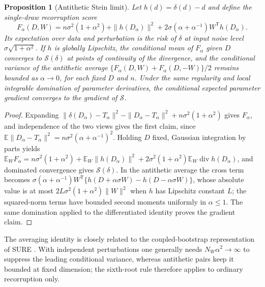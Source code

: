 \documentclass[11pt]{article}
\theoremstyle{plain}\newtheorem{proposition}{Proposition}
\newcommand{\E}{\mathbb E}
\begin{document}
\begin{proposition}[Antithetic Stein limit]\label{prop:antithetic}
Let $h(d)=\delta(d)-d$ and define the single-draw recorruption score
$$
F_\alpha(D,W)=n\sigma^2(1+\alpha^2)+\|h(D_\alpha)\|^2+2\sigma(\alpha+\alpha^{-1})W^{\mathsf T}h(D_\alpha).
$$
Its expectation over data and perturbation is the risk of $\delta$ at input noise level
$\sigma\sqrt{1+\alpha^2}$. If $h$ is globally Lipschitz, the conditional mean of $F_\alpha$ given $D$
converges to $\mathcal S(\delta)$ at points of continuity of the divergence, and the
conditional variance of the antithetic average $\{F_\alpha(D,W)+F_\alpha(D,-W)\}/2$ remains bounded as
$\alpha\to0$, for each fixed $D$ and $n$. Under the same regularity and local integrable domination
of parameter derivatives, the conditional expected parameter gradient converges to the
gradient of $\mathcal S$.
\end{proposition}

\begin{proof}
Expanding $\|\delta(D_\alpha)-T_\alpha\|^2-\|D_\alpha-T_\alpha\|^2+n\sigma^2(1+\alpha^2)$ gives $F_\alpha$, and independence
of the two views gives the first claim, since $\E\|D_\alpha-T_\alpha\|^2=n\sigma^2(\alpha+\alpha^{-1})^2$. Holding
$D$ fixed, Gaussian integration by parts yields
$\E_WF_\alpha=n\sigma^2(1+\alpha^2)+\E_W\|h(D_\alpha)\|^2+2\sigma^2(1+\alpha^2)\E_W\operatorname{div}h(D_\alpha)$,
and dominated convergence gives $\mathcal S(\delta)$. In the antithetic average the cross term
becomes $\sigma(\alpha+\alpha^{-1})W^{\mathsf T}\{h(D+\alpha\sigma W)-h(D-\alpha\sigma W)\}$, whose absolute value is
at most $2L\sigma^2(1+\alpha^2)\|W\|^2$ when $h$ has Lipschitz constant $L$; the squared-norm terms
have bounded second moments uniformly in $\alpha\le1$. The same domination applied to the
differentiated identity proves the gradient claim.
\end{proof}

The averaging identity is closely related to the coupled-bootstrap representation of SURE
\citep{oliveira2021unbiased}. With independent perturbations one generally needs $N_W\alpha^2\to\infty$
to suppress the leading conditional variance, whereas antithetic pairs keep it bounded at
fixed dimension; the sixth-root rule therefore applies to ordinary recorruption only.




\end{document}
